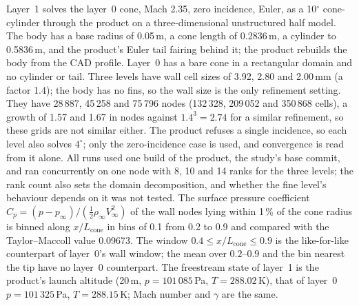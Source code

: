 \documentclass[11pt,a4paper]{article}
\newcommand{\Cp}{C_p}
\newcommand{\pinf}{p_\infty}
\begin{document}
Layer~1 solves the layer~0 cone, Mach 2.35, zero incidence, Euler, as a 10$^\circ$ cone-cylinder through the product
on a three-dimensional unstructured half model.
The body has a base radius of 0.05\,m, a cone length of 0.2836\,m, a cylinder to 0.5836\,m, and the product's Euler tail
fairing behind it; the product rebuilds the body from the CAD profile.
Layer~0 has a bare cone in a rectangular domain and no cylinder or tail.
Three levels have wall cell sizes of 3.92, 2.80 and 2.00\,mm (a factor 1.4); the body has no fins, so the wall size is the
only refinement setting.
They have 28\,887, 45\,258 and 75\,796 nodes (132\,328, 209\,052 and 350\,868 cells), a growth of 1.57 and 1.67 in nodes against
$1.4^3=2.74$ for a similar refinement, so these grids are not similar either.
The product refuses a single incidence, so each level also solves $4^\circ$; only the zero-incidence case is used, and
convergence is read from it alone.
All runs used one build of the product, the study's base commit, and ran concurrently on one node with 8, 10 and 14
ranks for the three levels; the rank count also sets the domain decomposition, and whether the fine level's behaviour
depends on it was not tested.
The surface pressure coefficient $\Cp=(p-\pinf)/(\tfrac12\rho_\infty V_\infty^2)$ of the wall nodes lying within 1\,\% of the
cone radius is binned along $x/L_\mathrm{cone}$ in bins of 0.1 from 0.2 to 0.9 and compared with the Taylor--Maccoll value
0.09673.
The window $0.4\le x/L_\mathrm{cone}\le0.9$ is the like-for-like counterpart of layer~0's wall window; the mean over
$0.2$--$0.9$ and the bin nearest the tip have no layer~0 counterpart.
The freestream state of layer~1 is the product's launch altitude (20\,m, $p=101\,085$\,Pa, $T=288.02$\,K), that of layer~0
$p=101\,325$\,Pa, $T=288.15$\,K; Mach number and $\gamma$ are the same.
\end{document}
